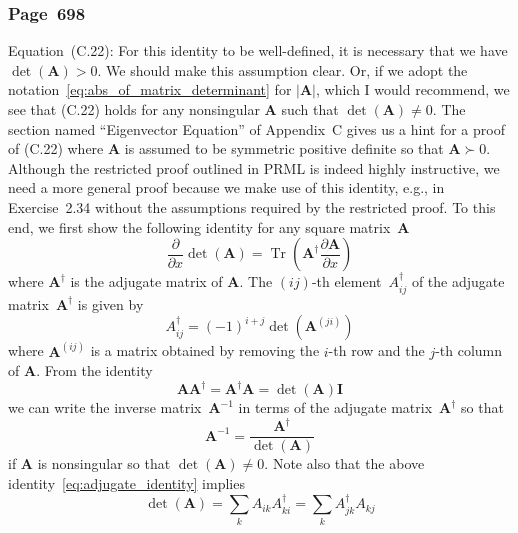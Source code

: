 \documentclass[12pt,a4paper]{article}
\newcommand{\erratum}[1]{\subsubsection*{#1}}
\begin{document}
\erratum{Page~698}
Equation~(C.22):
For this identity to be well-defined,
it is necessary that we have $\operatorname{det}(\mathbf{A}) > 0$.
We should make this assumption clear.
Or, if we adopt the notation~\eqref{eq:abs_of_matrix_determinant} for $\left|\mathbf{A}\right|$,
which I would recommend,
we see that (C.22) holds for any nonsingular $\mathbf{A}$ such that
$\operatorname{det}(\mathbf{A}) \neq 0$.
The section named ``Eigenvector Equation'' of Appendix~C gives us a hint for a proof of (C.22)
where $\mathbf{A}$ is assumed to be symmetric positive definite so that $\mathbf{A} \succ 0$.
Although the restricted proof outlined in PRML is indeed highly instructive,
we need a more general proof because we make use of this identity, e.g., in Exercise~2.34
without the assumptions required by the restricted proof.
To this end, we first show the following identity for any square matrix~$\mathbf{A}$
\begin{equation}
\frac{\partial}{\partial x} \operatorname{det}\left(\mathbf{A}\right) =
\operatorname{Tr}\left(\mathbf{A}^{\dagger}\frac{\partial\mathbf{A}}{\partial x}\right)
\label{eq:Jacobi_formula}
\end{equation}
where $\mathbf{A}^{\dagger}$ is the adjugate matrix of
$\mathbf{A}$.
The $(ij)$-th element~$A_{ij}^{\dagger}$ of the adjugate matrix~$\mathbf{A}^{\dagger}$ is given by
\begin{equation}
A_{ij}^{\dagger} = (-1)^{i+j} \operatorname{det}\left(\mathbf{A}^{(ji)}\right)
\label{eq:definition_of_adjugate}
\end{equation}
where $\mathbf{A}^{(ij)}$ is a matrix obtained by removing
the $i$-th row and the $j$-th column of $\mathbf{A}$.
From the identity
\begin{equation}
\mathbf{A}\mathbf{A}^{\dagger} = \mathbf{A}^{\dagger}\mathbf{A} =
\operatorname{det}(\mathbf{A})\mathbf{I}
\label{eq:adjugate_identity}
\end{equation}
we can write the inverse matrix~$\mathbf{A}^{-1}$ in terms of
the adjugate matrix~$\mathbf{A}^{\dagger}$ so that
\begin{equation}
\mathbf{A}^{-1} = \frac{\mathbf{A}^{\dagger}}{\operatorname{det}(\mathbf{A})}
\label{eq:inverse_in_terms_of_adjugate}
\end{equation}
if $\mathbf{A}$ is nonsingular so that $\operatorname{det}(\mathbf{A}) \neq 0$.
Note also that the above identity~\eqref{eq:adjugate_identity} implies
\begin{equation}
\operatorname{det}(\mathbf{A}) =
\sum_{k} A_{ik} A_{ki}^{\dagger} = \sum_{k} A_{jk}^{\dagger} A_{kj}
\label{eq:determinant_expansion}
\end{equation}
\end{document}
